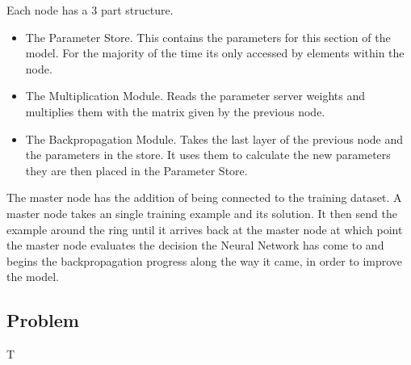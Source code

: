 Each node has a 3 part structure.
\begin{itemize}
    \item The Parameter Store. This contains the parameters for this section of
    the model. For the majority of the time its only accessed by elements within
    the node.
    \item The Multiplication Module. Reads the parameter server weights and
    multiplies them with the matrix given by the previous node.
    \item The Backpropagation Module. Takes the last layer of the previous node
    and the parameters in the store. It uses them to calculate the new
    parameters they are then placed in the Parameter Store.
\end{itemize}

The master node has the addition of being connected to the training dataset. A
master node takes an single training example and its solution. It then send the
example around the ring until it arrives back at the master node at which point
the master node evaluates the decision the Neural Network has come to and begins
the backpropagation progress along the way it came, in order to improve the
model.










\subsection{Problem}
T\lipsum[4]

